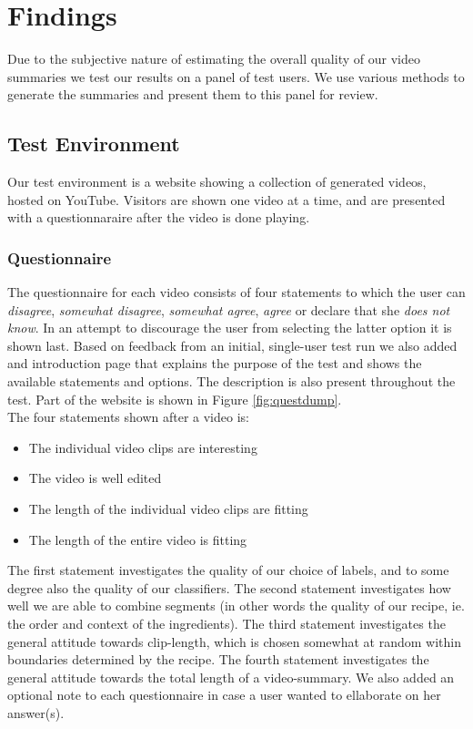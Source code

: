 %
\section{Findings}
%
Due to the subjective nature of estimating the overall quality of our video summaries we test our results on a panel of test users. We use various methods to generate the summaries and present them to this panel for review.
%
\subsection{Test Environment}
%
Our test environment is a website showing a collection of generated videos, hosted on YouTube. Visitors are shown one video at a time, and are presented with a questionnaraire after the video is done playing.
%
\subsubsection{Questionnaire}
%
%
The questionnaire for each video consists of four statements to which the user can \textit{disagree}, \textit{somewhat disagree}, \textit{somewhat agree}, \textit{agree} or declare that she \textit{does not know}. In an attempt to discourage the user from selecting the latter option it is shown last. Based on feedback from an initial, single-user test run we also added and introduction page that explains the purpose of the test and shows the available statements and options. The description is also present throughout the test. Part of the website is shown in Figure \ref{fig:questdump}.\\
%
The four statements shown after a video is:
%
\begin{itemize}
\item The individual video clips are interesting
\item The video is well edited
\item The length of the individual video clips are fitting
\item The length of the entire video is fitting
\end{itemize}
%
The first statement investigates the quality of our choice of labels, and to some degree also the quality of our classifiers. The second statement investigates how well we are able to combine segments (in other words the quality of our recipe, ie. the order and context of the ingredients). The third statement investigates the general attitude towards clip-length, which is chosen somewhat at random within boundaries determined by the recipe. The fourth statement investigates the general attitude towards the total length of a video-summary. We also added an optional note to each questionnaire in case a user wanted to ellaborate on her answer(s).
